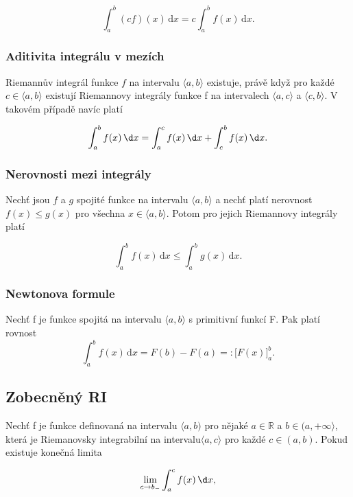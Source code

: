 \documentclass{szzclass}
\begin{document}
\begin{equation*}
\int_a^b (cf)(x)\,\mathrm{d}x = c \int_a^b f(x)\,\mathrm{d}x.\end{equation*}

\subsubsection{Aditivita integrálu v mezích}
Riemannův integrál funkce $f$ na intervalu $\langle a,b \rangle$
existuje, právě když pro každé $c\in\langle a,b \rangle$ existují
Riemannovy integrály funkce f na intervalech $\langle a,c \rangle$
a $\langle c,b \rangle$. V takovém případě navíc platí

\begin{equation*}
\int_a^b f(x)\,\d x  = \int_a^c f(x)\,\d x + \int_c^b f(x)\,\d x.\end{equation*}


\subsubsection{Nerovnosti mezi integrály}
Nechť jsou $f$ a $g$ spojité funkce na intervalu $\langle a,b \rangle$
a nechť platí nerovnost $f(x)\leq g(x)$ pro všechna
$x\in\langle a,b \rangle$. Potom pro jejich Riemannovy integrály platí

\begin{equation*}
\int_a^b f(x)\,\mathrm{d}x \leq \int_a^b g(x)\,\mathrm{d}x.\end{equation*}


\subsubsection{Newtonova formule}
Nechť f je funkce spojitá na intervalu $\langle a,b \rangle$ s primitivní funkcí F. Pak platí rovnost
\begin{equation*}
\int_a^b f(x) \,\mathrm{d}x = F(b) - F(a) =: \Big[ F(x) \Big]_a^b.\end{equation*}


\subsection{Zobecněný RI}
Nechť f je funkce definovaná na intervalu $\langle a,b )$
pro nějaké $a\in\mathbb{R}$ a $b\in(a,+\infty\rangle$,
která je Riemanovsky integrabilní na intervalu$\langle a,c \rangle$
pro každé $c\in(a,b)$. Pokud existuje konečná limita

\begin{equation*}
\lim_{c \to b_-} \int_a^c f(x)\, \d x,\end{equation*}
\end{document}
